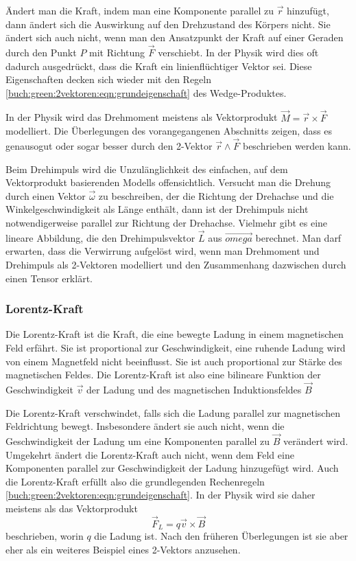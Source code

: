 Ändert man die Kraft, indem man eine Komponente parallel zu $\vec{r}$
hinzufügt, dann ändert sich die Auswirkung auf den Drehzustand des
Körpers nicht.
Sie ändert sich auch nicht, wenn man den Ansatzpunkt der Kraft
auf einer Geraden durch den Punkt $P$ mit Richtung $\vec{F}$
verschiebt.
In der Physik wird dies oft dadurch ausgedrückt, dass die Kraft
ein linienflüchtiger Vektor sei.
Diese Eigenschaften decken sich wieder mit den Regeln
\eqref{buch:green:2vektoren:eqn:grundeigenschaft}
des Wedge-Produktes.

In der Physik wird das Drehmoment meistens als Vektorprodukt
$\vec{M}=\vec{r}\times\vec{F}$ modelliert.
Die Überlegungen des vorangegangenen Abschnitts zeigen, dass
es genausogut oder sogar besser durch den 2-Vektor
$\vec{r}\wedge\vec{F}$ beschrieben werden kann.

Beim Drehimpuls wird die Unzulänglichkeit des einfachen, auf
dem Vektorprodukt basierenden Modells offensichtlich.
Versucht man die Drehung durch einen Vektor $\vec{\omega}$ zu
beschreiben, der die Richtung der Drehachse und die Winkelgeschwindigkeit
als Länge enthält, dann ist der Drehimpuls nicht notwendigerweise
parallel zur Richtung der Drehachse.
Vielmehr gibt es eine lineare Abbildung, die den Drehimpulsvektor
$\vec{L}$ aus $\vec{omega}$ berechnet.
Man darf erwarten, dass die Verwirrung aufgelöst wird, wenn man
Drehmoment und Drehimpuls als 2-Vektoren modelliert und den Zusammenhang
dazwischen durch einen Tensor erklärt.

%
%
\subsubsection{Lorentz-Kraft}
Die Lorentz-Kraft ist die Kraft, die eine bewegte Ladung in einem
magnetischen Feld erfährt.
Sie ist proportional zur Geschwindigkeit, eine ruhende Ladung
wird von einem Magnetfeld nicht beeinflusst.
Sie ist auch proportional zur Stärke des magnetischen Feldes.
Die Lorentz-Kraft ist also eine bilineare Funktion der
Geschwindigkeit $\vec{v}$ der Ladung und des magnetischen
Induktionsfeldes $\vec{B}$

Die Lorentz-Kraft verschwindet, falls sich die Ladung parallel zur
magnetischen Feldrichtung bewegt.
Insbesondere ändert sie auch nicht, wenn die Geschwindigkeit der
Ladung um eine Komponenten parallel zu $\vec{B}$ verändert wird.
Umgekehrt ändert die Lorentz-Kraft auch nicht, wenn dem Feld
eine Komponenten parallel zur Geschwindigkeit der Ladung hinzugefügt
wird.
Auch die Lorentz-Kraft erfüllt also die grundlegenden
Rechenregeln \eqref{buch:green:2vektoren:eqn:grundeigenschaft}.
In der Physik wird sie daher meistens als das Vektorprodukt
\[
\vec{F}_L
=
q\vec{v}\times \vec{B}
\]
beschrieben, worin $q$ die Ladung ist.
Nach den früheren Überlegungen ist sie aber eher als ein weiteres
Beispiel eines 2-Vektors anzusehen.


